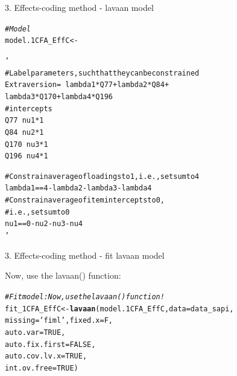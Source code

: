 \documentclass[10pt]{beamer}\usepackage[]{graphicx}\usepackage[]{xcolor}
\makeatletter
\newcommand{\hlnum}[1]{\textcolor[rgb]{0.686,0.059,0.569}{#1}}%
\newcommand{\hlstr}[1]{\textcolor[rgb]{0.192,0.494,0.8}{#1}}%
\newcommand{\hlcom}[1]{\textcolor[rgb]{0.678,0.584,0.686}{\textit{#1}}}%
\newcommand{\hlstd}[1]{\textcolor[rgb]{0.345,0.345,0.345}{#1}}%
\newcommand{\hlkwb}[1]{\textcolor[rgb]{0.69,0.353,0.396}{#1}}%
\newcommand{\hlkwc}[1]{\textcolor[rgb]{0.333,0.667,0.333}{#1}}%
\newcommand{\hlkwd}[1]{\textcolor[rgb]{0.737,0.353,0.396}{\textbf{#1}}}%
\newenvironment{kframe}{%
 \def\at@end@of@kframe{}%
 \ifinner\ifhmode%
  \def\at@end@of@kframe{\end{minipage}}%
  \begin{minipage}{\columnwidth}%
 \fi\fi%
 \def\FrameCommand##1{\hskip\@totalleftmargin \hskip-\fboxsep
 \colorbox{shadecolor}{##1}\hskip-\fboxsep
     \hskip-\linewidth \hskip-\@totalleftmargin \hskip\columnwidth}%
 \MakeFramed {\advance\hsize-\width
   \@totalleftmargin\z@ \linewidth\hsize
   \@setminipage}}%
 {\par\unskip\endMakeFramed%
 \at@end@of@kframe}
\newenvironment{knitrout}{}{} %
\makeatother
\begin{document}
%
\begin{frame}[fragile]{3. Effects-coding method - lavaan model}

\begin{knitrout}
\color{fgcolor}\begin{kframe}
\begin{alltt}
\hlcom{# Model}
\hlstd{model.1CFA_EffC} \hlkwb{<-} \hlstr{'
  # Label parameters, such that they can be constrained
  Extraversion =~ lambda1*Q77 + lambda2*Q84 + 
                  lambda3*Q170 + lambda4*Q196
  # intercepts
  Q77  ~ nu1*1
  Q84  ~ nu2*1
  Q170 ~ nu3*1
  Q196 ~ nu4*1
  
  # Constrain average of loadings to 1, i.e., set sum to 4
  lambda1 == 4 - lambda2 - lambda3 - lambda4
  # Constrain average of item intercepts to 0, 
  # i.e., set sum to 0
  nu1 == 0 - nu2 - nu3 - nu4
 '}
\end{alltt}
\end{kframe}
\end{knitrout}

\end{frame}
%
\begin{frame}[fragile]{3. Effects-coding method - fit lavaan model}

Now, use the lavaan() function:

\vspace{5mm}

\begin{knitrout}
\color{fgcolor}\begin{kframe}
\begin{alltt}
\hlcom{# Fit model: Now, use the lavaan() function!}
\hlstd{fit_1CFA_EffC} \hlkwb{<-} \hlkwd{lavaan}\hlstd{(model.1CFA_EffC,} \hlkwc{data}\hlstd{=data_sapi,}
                      \hlkwc{missing}\hlstd{=}\hlstr{'fiml'}\hlstd{,} \hlkwc{fixed.x}\hlstd{=F,}
                      \hlkwc{auto.var} \hlstd{=} \hlnum{TRUE}\hlstd{,}
                      \hlkwc{auto.fix.first} \hlstd{=} \hlnum{FALSE}\hlstd{,}
                      \hlkwc{auto.cov.lv.x} \hlstd{=} \hlnum{TRUE}\hlstd{,}
                      \hlkwc{int.ov.free} \hlstd{=} \hlnum{TRUE}\hlstd{)}
\end{alltt}
\end{kframe}
\end{knitrout}

\end{frame}
\end{document}
